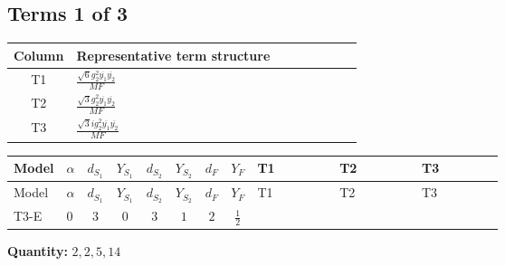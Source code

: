 \documentclass[8pt]{article}
\begin{document}
\begin{landscape}
\subsection*{Terms 1 of 3}
\begin{center}
\begin{tabular}{@{}c >{\raggedright\arraybackslash}p{0.82\linewidth}@{}}
\toprule
Column & Representative term structure \\
\midrule
T1 & \(\displaystyle \frac{\sqrt{6} g_{2}^{2} \overline{y_{1}} \overline{y_{2}}}{MF}\) \\
\midrule
T2 & \(\displaystyle \frac{\sqrt{3} g_{2}^{2} \overline{y_{1}} \overline{y_{2}}}{MF}\) \\
\midrule
T3 & \(\displaystyle \frac{\sqrt{3} i g_{2}^{2} \overline{y_{1}} \overline{y_{2}}}{MF}\) \\
\midrule
\bottomrule
\end{tabular}
\end{center}
\smallskip
\tiny
\begin{longtable}{@{}llcccccc >{\raggedright\arraybackslash}p{0.21\linewidth} >{\raggedright\arraybackslash}p{0.21\linewidth} >{\raggedright\arraybackslash}p{0.21\linewidth}@{}}
\toprule
Model & $\alpha$ & $d_{S_1}$ & $Y_{S_1}$ & $d_{S_2}$ & $Y_{S_2}$ & $d_F$ & $Y_F$ & T1 & T2 & T3 \\
\midrule
\endfirsthead
\toprule
Model & $\alpha$ & $d_{S_1}$ & $Y_{S_1}$ & $d_{S_2}$ & $Y_{S_2}$ & $d_F$ & $Y_F$ & T1 & T2 & T3 \\
\midrule
\endhead
T3-E & $0$ & $3$ & $0$ & $3$ & $1$ & $2$ & $\frac{1}{2}$ & \scriptsize\adjustbox{max width=\linewidth}{$\begin{gathered} - \frac{\sqrt{6} g_{2}^{2} \overline{y_{1}} \overline{y_{2}}}{3 MF}\end{gathered}$} & \scriptsize\adjustbox{max width=\linewidth}{$\begin{gathered} - \frac{\sqrt{3} g_{2}^{2} \overline{y_{1}} \overline{y_{2}}}{6 MF}\end{gathered}$} & \scriptsize\adjustbox{max width=\linewidth}{$\begin{gathered} - \frac{49 \sqrt{3} i g_{2}^{2} \overline{y_{1}} \overline{y_{2}}}{24 MF}\end{gathered}$} \\
\midrule
\bottomrule
\end{longtable}
\clearpage
\noindent\textbf{Quantity: }$\mathrm{2,2,5,14}$\par\smallskip

\end{landscape}
\end{document}
